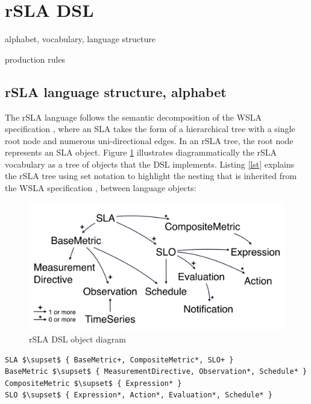 \section{rSLA DSL}
\label{sec:dsl}
alphabet, vocabulary, language structure

production rules

\subsection{rSLA language structure, alphabet}

The rSLA language follows the semantic decomposition of the WSLA specification \cite{wsla}, where an SLA takes the form of a hierarchical tree with a single root node and numerous uni-directional edges. In an rSLA tree, the root node represents an SLA object. Figure \ref{rSLA_diag} illustrates diagrammatically the rSLA vocabulary as a tree of objects that the DSL implements. Listing \ref{lst} explains the rSLA tree using set notation to highlight the nesting that is inherited from the WSLA specification \cite{wsla}, between language objects:

\begin{minipage}{0.5\textwidth}
\begin{figure}[H]
\includegraphics[width=1.0\textwidth]{pics/rslaobject}
\caption{\label{rSLA_diag} rSLA DSL object diagram}
\end{figure}
\end{minipage} \hfill
\begin{minipage}{0.5\textwidth}
\begin{lstlisting}[breaklines, mathescape, firstnumber=auto, caption=rSLA vocabulary, label=lst]
SLA $\supset$ { BaseMetric+, CompositeMetric*, SLO+ }
BaseMetric $\supset$ { MeasurementDirective, Observation*, Schedule* }
CompositeMetric $\supset$ { Expression* }
SLO $\supset$ { Expression*, Action*, Evaluation*, Schedule* }
\end{lstlisting}
\end{minipage}

